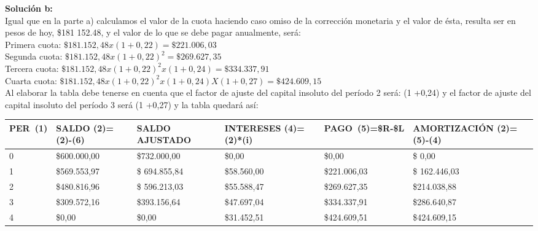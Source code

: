 \textbf{Solución b:}\\
Igual que en la parte a) calculamos el valor de la cuota haciendo caso omiso de la corrección monetaria y el valor de ésta, resulta ser en pesos de hoy, \$181 152.48, y el valor de lo que se debe pagar anualmente, será:\\

Primera cuota:	 $\$181.152,48 x (1 +0,22)   =\$221.006,03$\\
Segunda cuota:	 $\$181.152,48 x (1 +0,22)^{2}=\$269.627,35$\\
Tercera cuota:	 $\$181.152,48 x (1 +0,22)^{2}  x (1 +0,24)=\$334.337,91 $\\
Cuarta cuota:	 $\$181.152,48 x (1 +0,22)^{2}  x (1+0,24)X (1+0,27)=\$424.609,15$\\

Al elaborar la tabla debe tenerse en cuenta que el factor de ajuste del capital insoluto del período 2 será: (1 +0,24) y el factor de ajuste del capital insoluto del período 3 será (1 +0,27) y la tabla quedará así:

\begin{spacing}{1.1}
    \begin{center}
        \begin{tabular}{|p{1cm}|p{2cm}|p{3cm}|p{2cm}|p{2cm}||p{3cm}|}
        \hline 
        \rowcolor{white!50}
 \textbf{PER\ (1)}  & \textbf{SALDO (2)=(2)-(6)}& \textbf{SALDO AJUSTADO } & \textbf{INTERESES  (4)=(2)*(i)}& \textbf{PAGO\ (5)=\$R-\$L }& \textbf{AMORTIZACIÓN  (2)=(5)-(4)} \\ \hline                                    

            0 & \$600.000,00 & \$732.000,00 & \$0,00 & \$0,00 & \$ 0,00\\ \hline 
            1 & \$569.553,97  &\$ 694.855,84  & \$58.560,00  & \$221.006,03 & \$ 162.446,03 \\ \hline
            2 & \$480.816,96  &\$ 596.213,03  & \$55.588,47  & \$269.627,35 &\$214.038,88 \\ \hline
            3 & \$309.572,16 & \$393.156,64  & \$47.697,04 & \$334.337,91 & \$286.640,87 \\ \hline
            4 & \$0,00  & \$0,00  & \$31.452,51  & \$424.609,51 & \$424.609,15\\ \hline
          

 
\end{tabular}
\end{center}
\end{spacing}


